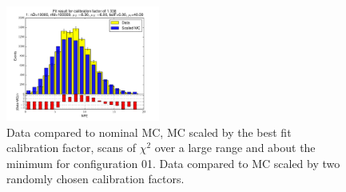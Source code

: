 \begin{figure}[htbp]
\begin{center}
\includegraphics[width=0.45\textwidth]{../FIGURES/01/FIG_Fit_result_for_calibration_factor_of_1_338.pdf} 
\caption{Data compared to nominal MC, MC scaled by the best fit calibration factor, scans of $\chi^2$ over a large range and about the minimum for configuration 01. Data compared to MC scaled by two randomly chosen calibration factors.} 
\label{tab:best_01} 
\end{center} \end{figure} 


